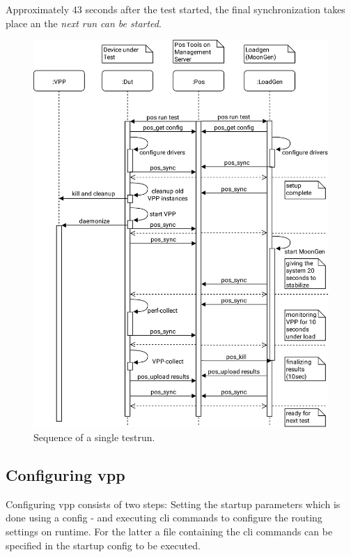 Approximately 43 seconds after the test started, the final
synchronization takes place an the \textit{next run can be started}.

\begin{figure}[!ht]
\noindent\hspace{0.5mm}\includegraphics[width=\linewidth]{pics/procedure-sequence.png}
\caption{Sequence of a single testrun. }
\label{testsequence}
\end{figure}


\subsection{Configuring \Ac{vpp}}


Configuring \Ac{vpp} consists of two steps: Setting the startup
parameters which is done using a \Ac{config} - and executing \Ac{cli}
commands to configure the routing settings on runtime. For the latter
a file containing the \Ac{cli} commands can be specified in the
startup \Ac{config} to be executed. 

